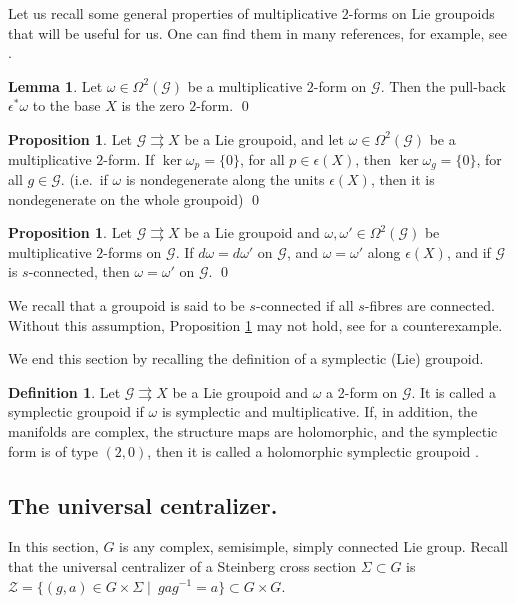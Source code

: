 \documentclass[a4paper,12pt,leqno]{amsart}
\numberwithin{equation}{section}
\theoremstyle{plain}
\theoremstyle{definition}
\newcommand{\cZ}{\mathcal{Z}}
\newcommand{\cG}{\mathcal{G}}
\newtheorem{lm}[thm]{Lemma}
\newtheorem{pro}[thm]{Proposition}
\newtheorem{df}[thm]{Definition}
\begin{document}
Let us recall some general properties of multiplicative $2$-forms on Lie groupoids that will be useful for us. One can find them in many references, for example, see \cite{MeXX}.


\begin{lm}\label{lm:zero}
Let $\omega\in\Omega^2(\cG)$ be a multiplicative $2$-form on $\cG$. Then the pull-back $\epsilon^*\omega$ to the base $X$ is the zero $2$-form.
\qed
\end{lm}

\begin{pro}\label{pro:nondegenerate}
Let $\cG\rightrightarrows X$ be a Lie groupoid, and let $\omega\in \Omega^2(\cG)$ be a multiplicative $2$-form. If $\ker \omega_p=\{0\}$,  for all $p\in \epsilon(X)$, then $\ker \omega_g=\{0\}$, for all $g\in\cG$. (i.e.\ if $\omega$ is nondegenerate along the units $\epsilon(X)$, then it is nondegenerate on the whole groupoid)
\qed
\end{pro}

\begin{pro}\label{pro:unit_to_all}
Let $\cG\rightrightarrows X$ be a Lie groupoid and $\omega, \omega ' \in \Omega^2(\cG)$ be multiplicative $2$-forms on $\cG$. If $d\omega=d\omega '$ on $\cG$, and $\omega=\omega '$ along $\epsilon(X)$, and if $\cG$ is $s$-connected, then $\omega=\omega '$ on $\cG$.
\qed
\end{pro}
We recall that a groupoid is said to be $s$-connected if all $s$-fibres are connected. Without this assumption, Proposition \ref{pro:unit_to_all} may not hold, see \cite{MeXX} for a counterexample.

We end this section by recalling the definition of a symplectic (Lie) groupoid.
\begin{df}
Let $\cG \rightrightarrows X$ be a Lie groupoid and $\omega$ a 2-form on $\cG$. It is called a symplectic groupoid if $\omega$ is symplectic and multiplicative. If, in addition, the manifolds are complex, the structure maps are holomorphic, and the symplectic form is of type $(2,0)$, then it is called a holomorphic symplectic groupoid \cite{LSX}.
\end{df}





\subsection{The universal centralizer.}\label{doub}
In this section, $G$ is any complex, semisimple, simply connected Lie group.
Recall that the universal centralizer of a Steinberg cross section $\Sigma\subset G$ is $\cZ=\{(g,a)\in G\times \Sigma \mid~ gag^{-1}=a\}\subset G\times G$. 
\end{document}
